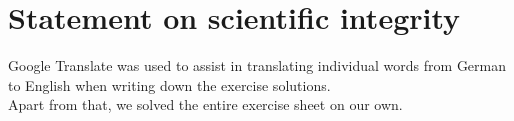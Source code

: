 \documentclass{article} %
\begin{document}
\section{}

\section{}

\section{}

\section*{Statement on scientific integrity}
Google Translate was used to assist in translating individual words from
German to English when writing down the exercise solutions.\\
Apart from that, we solved the entire exercise sheet on our own. 
\end{document}
